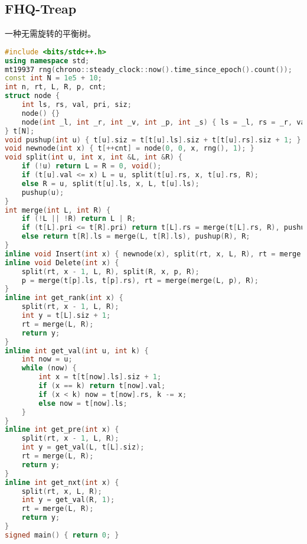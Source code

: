 \documentclass[9pt, a4paper, oneside]{book}
\begin{document}
\subsection{FHQ-Treap}
一种无需旋转的平衡树。
\begin{lstlisting}[language={C++}]
#include <bits/stdc++.h>
using namespace std;
mt19937 rng(chrono::steady_clock::now().time_since_epoch().count());
const int N = 1e5 + 10;
int n, rt, L, R, p, cnt;
struct node {
    int ls, rs, val, pri, siz;
    node() {}
    node(int _l, int _r, int _v, int _p, int _s) { ls = _l, rs = _r, val = _v, pri = _p, siz = _s; }
} t[N];
void pushup(int u) { t[u].siz = t[t[u].ls].siz + t[t[u].rs].siz + 1; }
void newnode(int x) { t[++cnt] = node(0, 0, x, rng(), 1); }
void split(int u, int x, int &L, int &R) {
    if (!u) return L = R = 0, void();
    if (t[u].val <= x) L = u, split(t[u].rs, x, t[u].rs, R);
    else R = u, split(t[u].ls, x, L, t[u].ls);
    pushup(u);
}
int merge(int L, int R) {
    if (!L || !R) return L | R;
    if (t[L].pri <= t[R].pri) return t[L].rs = merge(t[L].rs, R), pushup(L), L;
    else return t[R].ls = merge(L, t[R].ls), pushup(R), R;
}
inline void Insert(int x) { newnode(x), split(rt, x, L, R), rt = merge(merge(L, cnt), R); }
inline void Delete(int x) {
    split(rt, x - 1, L, R), split(R, x, p, R);
    p = merge(t[p].ls, t[p].rs), rt = merge(merge(L, p), R);
}
inline int get_rank(int x) {
    split(rt, x - 1, L, R);
    int y = t[L].siz + 1;
    rt = merge(L, R);
    return y;
}
inline int get_val(int u, int k) {
    int now = u;
    while (now) {
        int x = t[t[now].ls].siz + 1;
        if (x == k) return t[now].val;
        if (x < k) now = t[now].rs, k -= x;
        else now = t[now].ls;
    }
}
inline int get_pre(int x) {
    split(rt, x - 1, L, R);
    int y = get_val(L, t[L].siz);
    rt = merge(L, R);
    return y;
}
inline int get_nxt(int x) {
    split(rt, x, L, R);
    int y = get_val(R, 1);
    rt = merge(L, R);
    return y;
}
signed main() { return 0; }\end{lstlisting}
\end{document}
